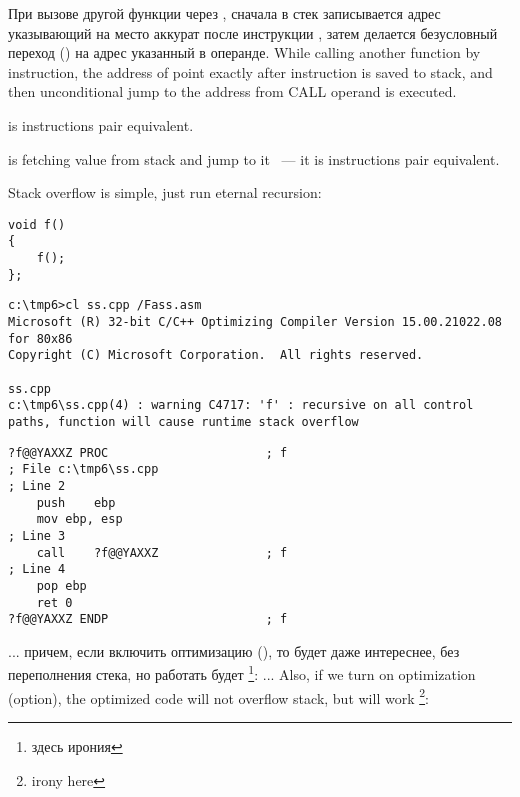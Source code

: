 \IFRU
{При вызове другой функции через \CALL, сначала в стек записывается адрес указывающий на место аккурат после 
инструкции \CALL, затем делается безусловный переход () на адрес указанный в операнде.} 
{While calling another function by \CALL instruction, the address of point exactly after \CALL instruction is saved 
to stack, and then unconditional jump to the address from CALL operand is executed.} 

{\CALL is  instructions pair equivalent}.

{\RET is fetching value from stack and jump to it ~--- it is  instructions pair equivalent.}

{Stack overflow is simple, just run eternal recursion:}

\begin{lstlisting}
void f()
{
	f();
};
\end{lstlisting}


\begin{lstlisting}
c:\tmp6>cl ss.cpp /Fass.asm
Microsoft (R) 32-bit C/C++ Optimizing Compiler Version 15.00.21022.08 for 80x86
Copyright (C) Microsoft Corporation.  All rights reserved.

ss.cpp
c:\tmp6\ss.cpp(4) : warning C4717: 'f' : recursive on all control paths, function will cause runtime stack overflow
\end{lstlisting}


\begin{lstlisting}
?f@@YAXXZ PROC						; f
; File c:\tmp6\ss.cpp
; Line 2
	push	ebp
	mov	ebp, esp
; Line 3
	call	?f@@YAXXZ				; f
; Line 4
	pop	ebp
	ret	0
?f@@YAXXZ ENDP						; f
\end{lstlisting}

\IFRU
{... причем, если включить оптимизацию (\Ox), то будет даже интереснее, без переполнения стека, 
но работать будет \footnote{здесь ирония}:}
{... Also, if we turn on optimization (\Ox option), the optimized code will not overflow stack, 
but will work \footnote{irony here}:}

